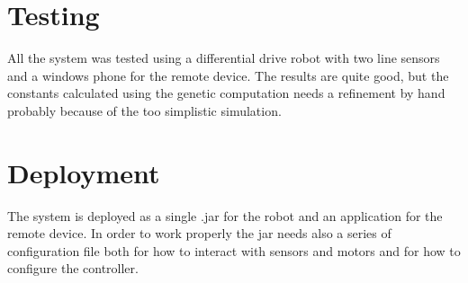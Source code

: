 \documentclass{llncs}
\newcommand{\labelsec}[1]{\label{sec:#1}}
\begin{document}
\section{Testing}
\labelsec{testing}
All the system was tested using a differential drive robot with two line sensors and a windows phone for the remote device. The results are quite good, but the constants calculated using the genetic computation needs a refinement by hand probably because of the too simplistic simulation.

\section{Deployment}
\labelsec{Deployment}
The system is deployed as a single .jar for the robot and an application for the remote device. In order to work properly the jar needs also a series of configuration file both for how to interact with sensors and motors and for how to configure the controller.

\end{document}
